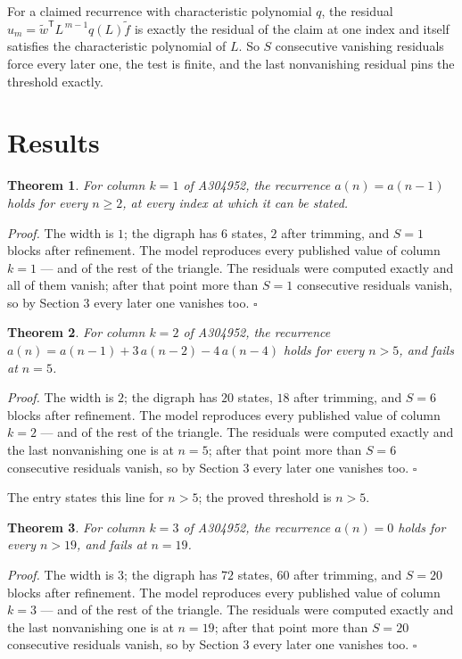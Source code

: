\documentclass[11pt]{article}
\newtheorem{theorem}{Theorem}
\theoremstyle{definition}
\begin{document}
For a claimed recurrence with characteristic polynomial $q$, the residual $u_m = \tilde w^{\mathsf T}L^{\,m-1}q(L)\tilde f$ is exactly the residual of the claim at one index and itself satisfies the characteristic polynomial of $L$. So $S$ consecutive vanishing residuals force every later one, the test is finite, and the last nonvanishing residual pins the threshold exactly.

\section{Results}

\begin{theorem} For column $k = 1$ of A304952, the recurrence $a(n) = a(n-1)$ holds for every $n \ge 2$, at every index at which it can be stated.\end{theorem}

{\itshape Proof.} The width is $1$; the digraph has $6$ states, $2$ after trimming, and $S = 1$ blocks after refinement. The model reproduces every published value of column $k = 1$ --- and of the rest of the triangle. The residuals were computed exactly and all of them vanish; after that point more than $S = 1$ consecutive residuals vanish, so by Section 3 every later one vanishes too. $\square$

\begin{theorem} For column $k = 2$ of A304952, the recurrence $a(n) = a(n-1) + 3\,a(n-2) - 4\,a(n-4)$ holds for every $n > 5$, and fails at $n = 5$.\end{theorem}

{\itshape Proof.} The width is $2$; the digraph has $20$ states, $18$ after trimming, and $S = 6$ blocks after refinement. The model reproduces every published value of column $k = 2$ --- and of the rest of the triangle. The residuals were computed exactly and the last nonvanishing one is at $n = 5$; after that point more than $S = 6$ consecutive residuals vanish, so by Section 3 every later one vanishes too. $\square$

The entry states this line for $n > 5$; the proved threshold is $n > 5$.

\begin{theorem} For column $k = 3$ of A304952, the recurrence $a(n) = 0$ holds for every $n > 19$, and fails at $n = 19$.\end{theorem}

{\itshape Proof.} The width is $3$; the digraph has $72$ states, $60$ after trimming, and $S = 20$ blocks after refinement. The model reproduces every published value of column $k = 3$ --- and of the rest of the triangle. The residuals were computed exactly and the last nonvanishing one is at $n = 19$; after that point more than $S = 20$ consecutive residuals vanish, so by Section 3 every later one vanishes too. $\square$
\end{document}
